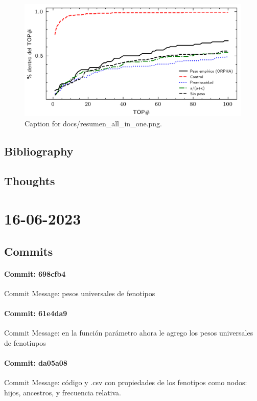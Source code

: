 \documentclass{article}
\begin{document}
\begin{figure}[h] \centering \includegraphics{docs/resumen_all_in_one.png} \caption{Caption for docs/resumen_all_in_one.png.} \end{figure}
\subsection{Bibliography}
\subsection{Thoughts}

\section{16-06-2023}
\subsection{Commits}
\paragraph{Commit: 698cfb4}
Commit Message: pesos universales de fenotipos

\paragraph{Commit: 61e4da9}
Commit Message: en la función parámetro ahora le agrego los pesos universales de fenotiupos

\paragraph{Commit: da05a08}
Commit Message: código y .csv con propiedades de los fenotipos como nodos: hijos, ancestros, y frecuencia relativa.
\end{document}
